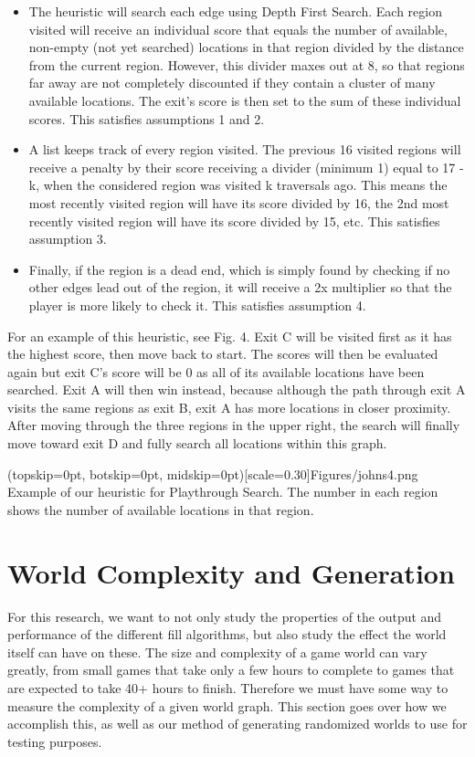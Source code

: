 \documentclass{ieeeaccess}
\begin{document}
\begin{itemize}
    \item The heuristic will search each edge using Depth First Search. Each region visited
    will receive an individual score that equals the number of available, non-empty (not yet
    searched) locations in that region divided by the distance from the current region.
    However, this divider maxes out at 8, so that regions far away are not completely
    discounted if they contain a cluster of many available locations. The exit's score is then
    set to the sum of these individual scores. This satisfies assumptions 1 and 2.
    \item A list keeps track of every region visited. The previous 16 visited regions will 
    receive a penalty by their score receiving a divider (minimum 1) equal to 17 - k, when the
    considered region was visited k traversals ago. This means the most recently visited region
    will have its score divided by 16, the 2nd most recently visited region will have its score
    divided by 15, etc. This satisfies assumption 3.
    \item Finally, if the region is a dead end, which is simply found by checking if no other
    edges lead out of the region, it will receive a 2x multiplier so that the player is more
    likely to check it. This satisfies assumption 4.
\end{itemize}

For an example of this heuristic, see Fig. 4. Exit C will be visited first as it has the
highest score, then move back to start. The scores will then be evaluated again but exit C's
score will be 0 as all of its available locations have been searched. Exit A will then win
instead, because although the path through exit A visits the same regions as exit B, exit A has
more locations in closer proximity. After moving through the three regions in the upper right,
the search will finally move toward exit D and fully search all locations within this graph.

\Figure[t!](topskip=0pt, botskip=0pt, midskip=0pt)[scale=0.30]{Figures/johns4.png}
{Example of our heuristic for Playthrough Search. The number in each region shows the number of
available locations in that region.\label{fig4}}

\section{World Complexity and Generation}
For this research, we want to not only study the properties of the output and performance of
the different fill algorithms, but also study the effect the world itself can have on these.
The size and complexity of a game world can vary greatly, from small games that take only a few
hours to complete to games that are expected to take 40+ hours to finish. Therefore we must
have some way to measure the complexity of a given world graph. This section goes over how we
accomplish this, as well as our method of generating randomized worlds to use for testing
purposes.
\end{document}
